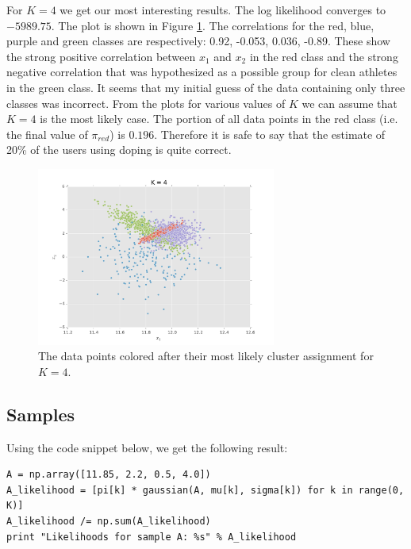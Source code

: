 \documentclass[paper=a4, fontsize=10pt]{scrartcl} %
\numberwithin{equation}{section} %
\numberwithin{figure}{section} %
\numberwithin{table}{section} %
\begin{document}
For $K = 4$ we get our most interesting results. The log likelihood converges to $-5989.75$. The plot is shown in Figure \ref{k4}. The correlations for the red, blue, purple and green classes are respectively: 0.92, -0.053, 0.036, -0.89. These show the strong positive correlation between $x_1$ and $x_2$ in the red class and the strong negative correlation that was hypothesized as a possible group for clean athletes in the green class. It seems that my initial guess of the data containing only three classes was incorrect. From the plots for various values of $K$ we can assume that $K=4$ is the most likely case. The portion of all data points in the red class (i.e. the final value of $\pi_{red}$) is $0.196$. Therefore it is safe to say that the estimate of 20\% of the users using doping is quite correct.

\begin{figure}[H]
	\centering
	\includegraphics[width=0.7\textwidth]{exercise_14b.pdf}
	\caption{The data points colored after their most likely cluster assignment for $K = 4$.}
	\label{k4}
\end{figure}

\subsection{Samples}
Using the code snippet below, we get the following result:

\begin{verbatim}
A = np.array([11.85, 2.2, 0.5, 4.0])
A_likelihood = [pi[k] * gaussian(A, mu[k], sigma[k]) for k in range(0, K)]
A_likelihood /= np.sum(A_likelihood)
print "Likelihoods for sample A: %s" % A_likelihood
\end{verbatim}
\end{document}
